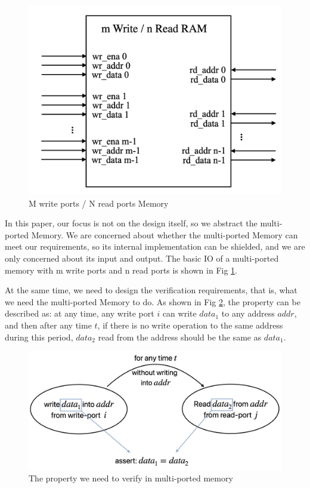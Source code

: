 \documentclass[conference]{IEEEtran}
\theoremstyle{definition}
\begin{document}
\begin{figure}[!htbp]
    \begin{center}
    \includegraphics[width=0.9\linewidth]{pics/mpmemoryio.png}
    \caption{M write ports / N read ports Memory}
    \label{fig: mpmemoryio}
    \end{center}
\end{figure}

In this paper, our focus is not on the design itself, so we abstract the multi-ported Memory. We are concerned about whether the multi-ported Memory can meet our requirements, so its internal implementation can be shielded, and we are only concerned about its input and output. The basic IO of a multi-ported memory with m write ports and n read ports is shown in Fig \ref{fig: mpmemoryio}.

At the same time, we need to design the verification requirements, that is, what we need the multi-ported Memory to do. As shown in Fig \ref{fig: memverify}, the property can be described as: at any time, any write port $i$ can write $data_1$ to any address $addr$, and then after any time $t$, if there is no write operation to the same address during this period, $data_2$ read from the address should be the same as $data_1$.

\begin{figure}[!htbp]
    \begin{center}
    \includegraphics[width=1\linewidth]{pics/memverify.png}
    \caption{The property we need to verify in multi-ported memory}
    \label{fig: memverify}
    \end{center}
\end{figure}
\end{document}
